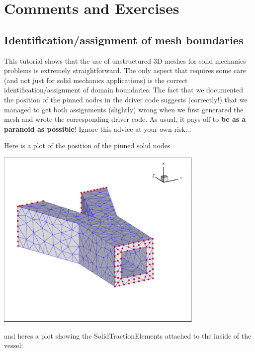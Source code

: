 \hypertarget{index_comm_ex}{}\section{Comments and Exercises}\label{index_comm_ex}
\hypertarget{index_bound}{}\subsection{Identification/assignment of mesh boundaries}\label{index_bound}
This tutorial shows that the use of unstructured 3D meshes for solid mechanics problems is extremely straightforward. The only aspect that requires some care (and not just for solid mechanics applications) is the correct identification/assignment of domain boundaries. The fact that we documented the position of the pinned nodes in the driver code suggests (correctly!) that we managed to get both assignments (slightly) wrong when we first generated the mesh and wrote the corresponding driver code. As usual, it pays off to {\bfseries be as a paranoid as possible}! Ignore this advice at your own risk...

Here is a plot of the position of the pinned solid nodes

 
\begin{DoxyImage}
\includegraphics[width=0.75\textwidth]{pinned_solid_nodes}
\end{DoxyImage}


and here\textquotesingle{}s a plot showing the {\ttfamily Solid\+Traction\+Elements} attached to the inside of the vessel\+:

